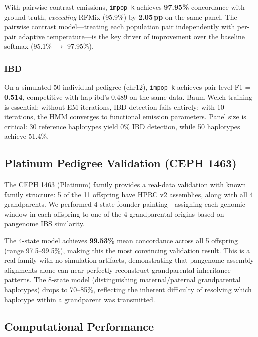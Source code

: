 With pairwise contrast emissions, \texttt{impop\_k} achieves \textbf{97.95\%} concordance with ground truth, \emph{exceeding} RFMix (95.9\%) by \textbf{2.05\,pp} on the same panel. The pairwise contrast model---treating each population pair independently with per-pair adaptive temperature---is the key driver of improvement over the baseline softmax (95.1\% $\to$ 97.95\%).

\subsubsection{IBD}
\label{sec:sim_ibd}

On a simulated 50-individual pedigree (chr12), \texttt{impop\_k} achieves pair-level F1 = \textbf{0.514}, competitive with hap-ibd's 0.489 on the same data. Baum-Welch training is essential: without EM iterations, IBD detection fails entirely; with 10 iterations, the HMM converges to functional emission parameters. Panel size is critical: 30 reference haplotypes yield 0\% IBD detection, while 50 haplotypes achieve 51.4\%.

\subsection{Platinum Pedigree Validation (CEPH 1463)}
\label{sec:platinum_pedigree}

The CEPH 1463 (Platinum) family provides a real-data validation with known family structure: 5 of the 11 offspring have HPRC v2 assemblies, along with all 4 grandparents. We performed 4-state founder painting---assigning each genomic window in each offspring to one of the 4 grandparental origins based on pangenome IBS similarity.

The 4-state model achieves \textbf{99.53\%} mean concordance across all 5 offspring (range 97.5--99.5\%), making this the most convincing validation result. This is a real family with no simulation artifacts, demonstrating that pangenome assembly alignments alone can near-perfectly reconstruct grandparental inheritance patterns. The 8-state model (distinguishing maternal/paternal grandparental haplotypes) drops to 70--85\%, reflecting the inherent difficulty of resolving which haplotype within a grandparent was transmitted.

\subsection{Computational Performance}
\label{sec:computational_performance}

